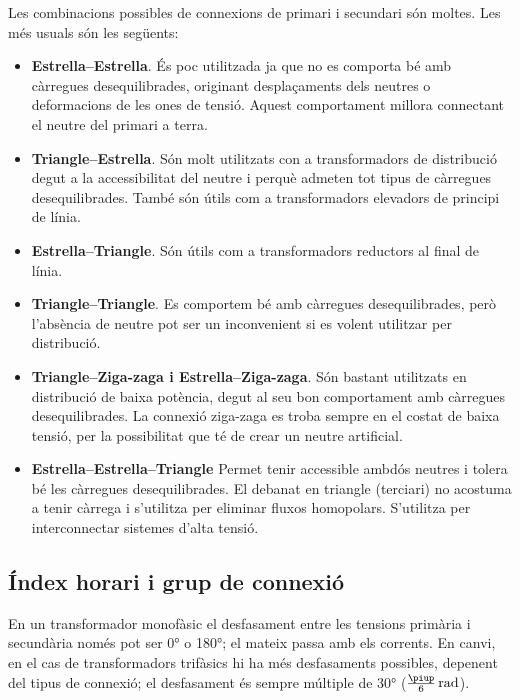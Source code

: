 Les combinacions possibles de connexions de primari i secundari són moltes. Les més usuals són les següents:
\begin{itemize}
   \item \textbf{Estrella--Estrella}. És poc utilitzada ja que no es comporta bé amb càrregues desequilibrades, originant desplaçaments dels neutres o deformacions de les ones de tensió. Aquest comportament millora connectant el neutre del primari a terra.
   \item \textbf{Triangle--Estrella}. Són molt utilitzats con a transformadors de distribució degut a la accessibilitat del neutre i perquè admeten tot tipus de càrregues desequilibrades. També són útils com a transformadors elevadors de principi de línia.
   \item \textbf{Estrella--Triangle}. Són útils com a transformadors reductors al final de línia.
   \item \textbf{Triangle--Triangle}. Es comportem bé amb càrregues desequilibrades, però l'absència de neutre pot ser un inconvenient si es volent utilitzar per distribució.
   \item \textbf{Triangle--Ziga-zaga i Estrella--Ziga-zaga}. Són bastant utilitzats en distribució de baixa potència, degut al seu bon comportament amb càrregues desequilibrades. La connexió ziga-zaga es troba sempre en el costat de baixa tensió, per la possibilitat que té de crear un neutre artificial.
   \item \textbf{Estrella--Estrella--Triangle} Permet tenir accessible ambdós  neutres i tolera  bé les càrregues  desequilibrades. El debanat en triangle (terciari) no acostuma a tenir càrrega i s'utilitza per eliminar fluxos homopolars. S'utilitza per interconnectar sistemes d'alta tensió.
\end{itemize}


\subsection{Índex horari i grup de connexió}\label{sec:connex-index-horari}

En un transformador monofàsic el desfasament entre les tensions primària i secundària només pot ser \ang{0} o \ang{180}; el mateix passa amb els corrents. En canvi, en el cas de transformadors trifàsics hi ha més desfasaments possibles, depenent del tipus de connexió; el desfasament és sempre múltiple de \ang{30} ($\frac{\piup}{6}\unit{rad}$).

